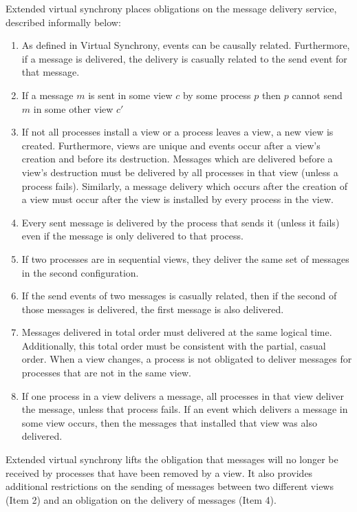 Extended virtual synchrony places obligations on the message delivery service, described informally below:
\begin{enumerate}
	\item As defined in Virtual Synchrony, events can be causally related.
		Furthermore, if a message is delivered, the delivery is casually
		related to the send event for that message. 
	\item If a message $m$ is sent in some view $c$ by some process $p$ then $p$
		cannot send $m$ in some other view $c'$
	\item If not all processes install a view or a process leaves a view, a new
		view is created. Furthermore, views are unique and events occur after a
		view's creation and before its destruction. Messages which are delivered
		before a view's destruction must be delivered by all processes in that
		view (unless a process fails). Similarly, a message delivery which occurs
		after the creation of a view must occur after the view is installed by
		every process in the view.
	\item Every sent message is delivered by the process that sends it (unless it
		fails) even if the message is only delivered to that process.
	\item If two processes are in sequential views, they deliver the same set of
		messages in the second configuration.
	\item If the send events of two messages is casually related, then if the
		second of those messages is delivered, the first message is also delivered.
	\item Messages delivered in total order must delivered at the same logical time.
		Additionally, this total order must be consistent with the partial, casual
		order. When a view changes, a process is not obligated to deliver messages
		for processes that are not in the same view.
	\item If one process in a view delivers a message, all processes in that view
		deliver the message, unless that process fails. If an event which delivers
		a message in some view occurs, then the messages that installed that view
		was also delivered.
\end{enumerate} \cite{EXTENDEDVIRTUALSYNCHRONY}

Extended virtual synchrony lifts the obligation that messages will no longer be received by processes that have been removed by a view. It also provides additional restrictions on the sending of messages between two different views (Item 2) and an obligation on the delivery of messages (Item 4). 

